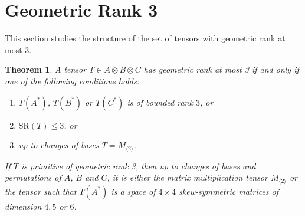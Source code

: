 \documentclass[10pt]{article} %
\newcommand{\ot}{\otimes}
\newtheorem{thm}{Theorem}
\theoremstyle{definition}
\begin{document}
\section{Geometric Rank 3}\label{sec:gr3}

This section studies the structure of the set of tensors with geometric rank at most 3.

\begin{thm}\label{gr3thm}
A tensor $T\in A\ot B\ot C$ has geometric rank at most 3 if and only if one of the following conditions holds:
\begin{enumerate}
    \item $T(A^*)$, $T(B^*)$ or $T(C^*)$ is of bounded rank $3$, or
    \item $\mathrm{SR}(T)\leq 3$, or
    \item up to changes of bases $T=M_{\langle 2\rangle}$.
\end{enumerate}
    
If $T$ is primitive of geometric rank 3, then up to changes of bases and permutations of $A$, $B$ and $C$, it is either the matrix multiplication tensor $M_{\langle 2\rangle}$ or the tensor such that $T(A^*)$ is a space of $4\times 4$ skew-symmetric matrices of dimension $4,5$ or $6$.
\end{thm}
\end{document}
